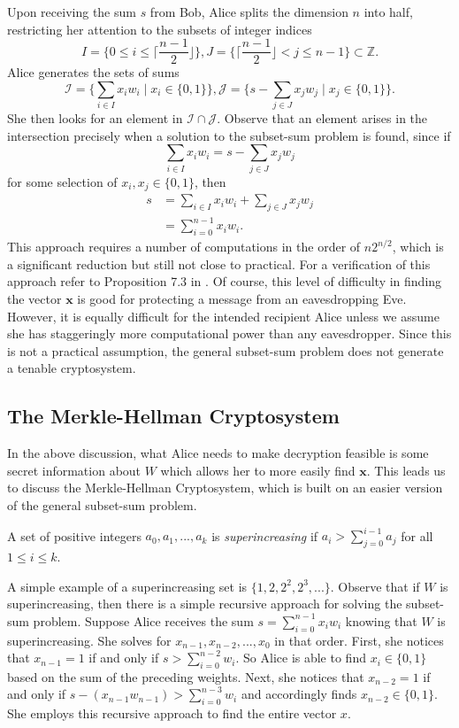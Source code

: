 \documentclass[a4paper,12pt]{article}
\begin{document}
Upon receiving the sum $s$ from Bob, Alice splits the dimension $n$ into half, restricting her attention to the subsets of integer indices $$I = \Big\lbrace 0 \leq i \leq \Big\lceil\frac{n-1}{2}\Big\rfloor\Big\rbrace, J = \Big\lbrace \Big\lceil\frac{n-1}{2}\Big\rfloor < j \leq n-1 \Big\rbrace \subset \mathbb{Z}.$$
Alice generates the sets of sums $$\mathcal{I} = \Big\lbrace \sum_{i\in I}x_{i}w_{i} \mid x_i \in \lbrace 0,1 \rbrace \Big\rbrace , \mathcal{J} = \Big\lbrace s - \sum_{j\in J}x_{j}w_{j} \mid x_{j} \in \lbrace 0,1 \rbrace \Big\rbrace.$$ She then looks for an element in $\mathcal{I} \cap \mathcal{J}$. Observe that an element arises in the intersection precisely when a solution to the subset-sum problem is found, since if $$\sum_{i\in I}x_{i}w_{i} = s - \sum_{j\in J}x_{j}w_{j}$$ for some selection of $x_{i},x_{j} \in \lbrace 0,1 \rbrace$, then 
\begin{align*}
    s &= \sum_{i\in I}x_{i}w_{i} + \sum_{j\in J}x_{j}w_{j} \\
      &= \sum_{i=0}^{n-1}x_{i}w_{i}.
\end{align*}
This approach requires a number of computations in the order of $n2^{n/2}$, which is a significant reduction but still not close to practical. For a verification of this approach refer to Proposition 7.3 in \cite{HPS}. Of course, this level of difficulty in finding the vector $\mathbf{x}$ is good for protecting a message from an eavesdropping Eve. However, it is equally difficult for the intended recipient Alice unless we assume she has staggeringly more computational power than any eavesdropper. Since this is not a practical assumption, the general subset-sum problem does not generate a tenable cryptosystem. 

\subsection{The Merkle-Hellman Cryptosystem}
In the above discussion, what Alice needs to make decryption feasible is some secret information about $W$ which allows her to more easily find $\mathbf{x}$. This leads us to discuss the Merkle-Hellman Cryptosystem, which is built on an easier version of the general subset-sum problem.

\begin{defn}
    A set of positive integers $a_0, a_1, ..., a_k$ is \textit{superincreasing} if $a_i > \sum_{j=0}^{i-1}a_j$ for all $1 \leq i \leq k$.
\end{defn}

A simple example of a superincreasing set is $\lbrace 1, 2, 2^{2}, 2^{3}, ...\rbrace$. Observe that if $W$ is superincreasing, then there is a simple recursive approach for solving the subset-sum problem. Suppose Alice receives the sum $s = \sum_{i=0}^{n-1}x_{i}w_{i}$ knowing that $W$ is superincreasing. She solves for $x_{n-1}, x_{n-2}, ..., x_0$ in that order. First, she notices that $x_{n-1} = 1$ if and only if $s > \sum_{i=0}^{n-2}w_{i}$. So Alice is able to find $x_i \in \lbrace 0,1 \rbrace$ based on the sum of the preceding weights. Next, she notices that $x_{n-2} = 1$ if and only if $s - (x_{n-1}w_{n-1}) > \sum_{i=0}^{n-3}w_{i}$ and accordingly finds $x_{n-2} \in \lbrace 0,1 \rbrace$. She employs this recursive approach to find the entire vector $x$.
\end{document}
